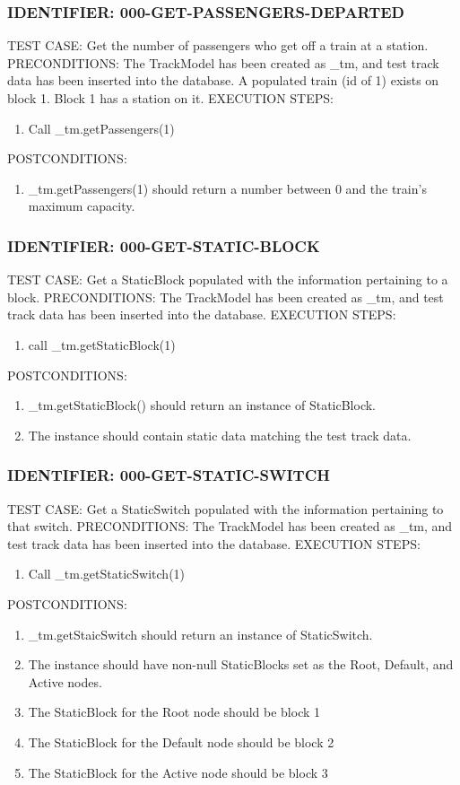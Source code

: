 \documentclass{scrreprt}
\begin{document}
\subsubsection{IDENTIFIER: 000-GET-PASSENGERS-DEPARTED}
TEST CASE: Get the number of passengers who get off a train at a station.
PRECONDITIONS: The TrackModel has been created as _tm, and test track data has been inserted into the database. A populated train (id of 1) exists on block 1. Block 1 has a station on it.
EXECUTION STEPS:
\begin{enumerate}
	\item Call _tm.getPassengers(1)
\end{enumerate}
POSTCONDITIONS:
\begin{enumerate}
	\item _tm.getPassengers(1) should return a number between 0 and the train's maximum capacity.
\end{enumerate}

\subsubsection{IDENTIFIER: 000-GET-STATIC-BLOCK}
TEST CASE: Get a StaticBlock populated with the information pertaining to a block.
PRECONDITIONS: The TrackModel has been created as _tm, and test track data has been inserted into the database.
EXECUTION STEPS:
\begin{enumerate}
	\item call _tm.getStaticBlock(1)
\end{enumerate}
POSTCONDITIONS:
\begin{enumerate}
	\item _tm.getStaticBlock() should return an instance of StaticBlock.
	\item The instance should contain static data matching the test track data.
\end{enumerate}

\subsubsection{IDENTIFIER: 000-GET-STATIC-SWITCH}
TEST CASE: Get a StaticSwitch populated with the information pertaining to that switch.
PRECONDITIONS: The TrackModel has been created as _tm, and test track data has been inserted into the database.
EXECUTION STEPS:
\begin{enumerate}
	\item Call _tm.getStaticSwitch(1)
\end{enumerate}
POSTCONDITIONS:
\begin{enumerate}
	\item _tm.getStaicSwitch should return an instance of StaticSwitch.
	\item The instance should have non-null StaticBlocks set as the Root, Default, and Active nodes.
	\item The StaticBlock for the Root node should be block 1
	\item The StaticBlock for the Default node should be block 2
	\item The StaticBlock for the Active node should be block 3
\end{enumerate}
\end{document}
